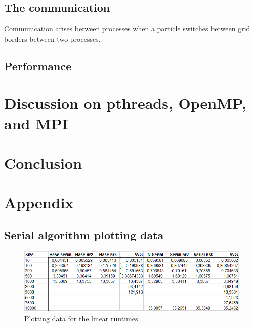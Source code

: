 \documentclass[a4paper,11pt,oneside]{book}
\begin{document}
\section{The communication}
Communication arises between processes when a particle switches between grid borders between two processes.

\section{Performance}


\chapter{Discussion on pthreads, OpenMP, and MPI}


\chapter{Conclusion}


\newpage
{}
\chapter{Appendix}
\section{Serial algorithm plotting data}

\begin{figure}[H]
  \centering
  \begin{minipage}[b]{0.9\textwidth}
    \includegraphics[width=\textwidth]{plotdata.png}
    \caption{Plotting data for the linear runtimes.}
  \end{minipage}
\end{figure}
\end{document}

